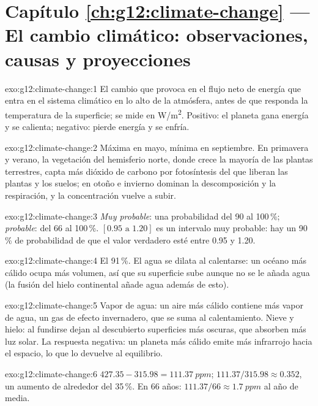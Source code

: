 \section*{Capítulo \ref{ch:g12:climate-change} --- El cambio climático: observaciones, causas y proyecciones}

\begin{solution}{exo:g12:climate-change:1}
El cambio que provoca en el flujo neto de energía que entra en el sistema climático
en lo alto de la atmósfera, antes de que responda la temperatura de la superficie;
se mide en \unit{W/m^2}. Positivo: el planeta gana energía y se calienta;
negativo: pierde energía y se enfría.
\end{solution}

\begin{solution}{exo:g12:climate-change:2}
Máxima en mayo, mínima en septiembre. En primavera y verano, la vegetación
del hemisferio norte, donde crece la mayoría de las plantas terrestres, capta más
dióxido de carbono por fotosíntesis del que liberan las plantas y los suelos; en otoño
e invierno dominan la descomposición y la respiración, y la concentración vuelve a subir.
\end{solution}

\begin{solution}{exo:g12:climate-change:3}
\emph{Muy probable}: una probabilidad del 90 al 100\,\%; \emph{probable}: del 66 al
100\,\%. $[0.95 \text{ a } 1.20]$ es un intervalo muy probable: hay un 90\,\% de probabilidad de que
el valor verdadero esté entre 0.95 y 1.20.
\end{solution}

\begin{solution}{exo:g12:climate-change:4}
El 91\,\%. El agua se dilata al calentarse: un océano más cálido ocupa más volumen, así que
su superficie sube aunque no se le añada agua (la fusión del hielo continental añade agua
además de esto).
\end{solution}

\begin{solution}{exo:g12:climate-change:5}
Vapor de agua: un aire más cálido contiene más vapor de agua, un gas de efecto invernadero, que se suma
al calentamiento. Nieve y hielo: al fundirse dejan al descubierto superficies más oscuras, que absorben
más luz solar. La respuesta negativa: un planeta más cálido emite más infrarrojo
hacia el espacio, lo que lo devuelve al equilibrio.
\end{solution}

\begin{solution}{exo:g12:climate-change:6}
$427.35 - 315.98 = \qty{111.37}{ppm}$; $111.37/315.98 \approx 0.352$, un
aumento de alrededor del 35\,\%. En 66 años: $111.37/66 \approx
\qty{1.7}{ppm}$ al año de media.
\end{solution}

